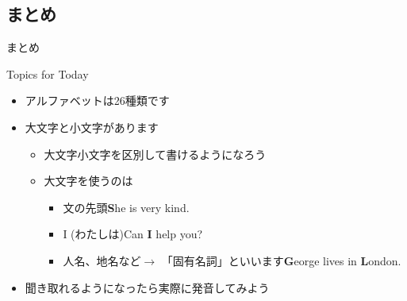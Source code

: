 \documentclass[aspectratio=169,xcolor={dvipsnames,table}]{beamer}
\begin{document}
\subsection{まとめ}
\begin{frame}[plain,label=matome]{まとめ}
  \begin{block}{Topics for Today}
\small
\pause
\begin{itemize}[square]
 \item アルファベットは26種類です\pause
 \item 大文字と小文字があります\pause
       \begin{itemize}
	\item 大文字小文字を区別して書けるようになろう\pause
        \item 大文字を使うのは\pause
              \begin{itemize}
	       \item 文の先頭\hfill{}\textbf{S}he is very kind.\pause
	       \item \textrm{I}\,\,(わたしは)\hfill{}Can \textbf{I} help you?\pause
	       \item 人名、地名など$\longrightarrow$ 「固有名詞」といいます\hfill{}\textbf{G}eorge lives in \textbf{L}ondon.\pause
	      \end{itemize}
       \end{itemize}
 \item 聞き取れるようになったら実際に発音してみよう
\end{itemize}
      \end{block}
\end{frame}
\end{document}
